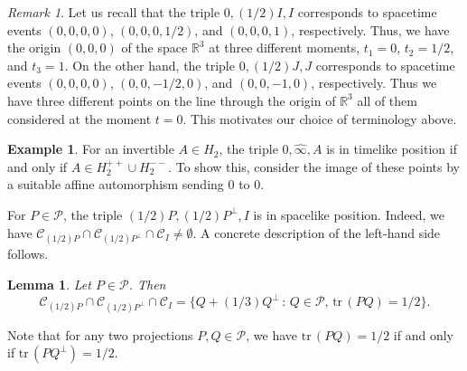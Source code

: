 \documentclass[10pt,a4paper]{amsart}
\newcommand\cP{{\mathcal{P}}}
\newcommand\oi{{\widehat{\infty}}}
\newtheorem{lemma}[theorem]{Lemma}
\theoremstyle{definition}
\newtheorem{example}[theorem]{Example}
\theoremstyle{remark}
\newtheorem{remark}[theorem]{Remark}
\numberwithin{subsection}{section}
\numberwithin{equation}{section}
\begin{document}
\begin{remark}\label{remark02}
Let us recall that the triple $0, (1/2)I, I$ corresponds to spacetime events $(0,0,0,0)$, $(0,0,0,1/2)$, and $(0,0,0,1)$, respectively. Thus, we have the origin $(0,0,0)$ of the space $\mathbb{R}^3$ at three different moments, $t_1 =0$, $t_2 = 1/2$, and $t_3 = 1$.  
On the other hand, the triple $0, (1/2)J, J$ corresponds to spacetime events $(0,0,0,0)$, $(0,0,-1/2, 0)$, and $(0,0,-1,0)$, respectively. Thus we have three different points on the line through the origin of $\mathbb{R}^3$ all of them considered at the moment $t=0$. 
This motivates our choice of terminology above.
\end{remark}

\begin{example}\label{definite}
For an invertible $A\in H_2$, the triple $0, \oi, A$ is in timelike position if and only if $A\in H_2^{++}\cup H_2^{--}$. 
To show this, consider the image of these points by a suitable affine automorphism sending $0$ to $0$.
\end{example}


For $P\in \cP$, the triple $(1/2)P, (1/2)P^\perp, I$ is in spacelike position. Indeed, we have $\mathcal{C}_{(1/2)P} \cap \mathcal{C}_{(1/2)P^\perp} \cap \mathcal{C}_I\neq \emptyset$. 
A concrete description of the left-hand side follows.
\begin{lemma}\label{nnjk}
Let $P \in \mathcal{P}$. Then
\[
\mathcal{C}_{(1/2)P} \cap \mathcal{C}_{(1/2)P^\perp} \cap \mathcal{C}_I = \{ Q + (1/3)Q^\perp \, : \, Q\in \mathcal{P}, \, \mathrm{tr}\, (PQ) = 1/2 \}.
\]
\end{lemma}

Note that for any two projections $P,Q \in \mathcal{P}$, we have $\mathrm{tr}\, (PQ) = 1/2$ if and only if $\mathrm{tr}\, (PQ^\perp) = 1/2$.
\end{document}
